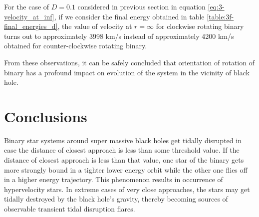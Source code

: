 \documentclass[a4paper]{article}
\begin{document}
\begin{enumerate} [label*=\textbf{(\alph*)}]
				For the case of \(D=0.1\) considered in previous section in equation \ref{eq:3-velocity_at_inf}, if we consider the final energy obtained in table \ref{table:3f-final_energies_d}, the value of velocity at \(r=\infty\) for clockwise rotating binary turns out to approximately 3998 km/s instead of approximately 4200 km/s obtained for counter-clockwise rotating binary.
				
				From these observations, it can be safely concluded that orientation of rotation of binary has a profound impact on evolution of the system in the vicinity of black hole.
				
					
			\end{enumerate}



		\clearpage
		\section{Conclusions} \label{3:conclusions}
		Binary star systems around super massive black holes get tidally disrupted in case the distance of closest approach is less than some threshold value. If the distance of closest approach is less than that value, one star of the binary gets more strongly bound in a tighter lower energy orbit while the other one flies off in a higher energy trajectory. This phenomenon results in occurrence of hypervelocity stars. In extreme cases of very close approaches, the stars may get tidally destroyed by the black hole's gravity, thereby becoming sources of observable transient tidal disruption flares.
		
		\clearpage
		
\end{document}
